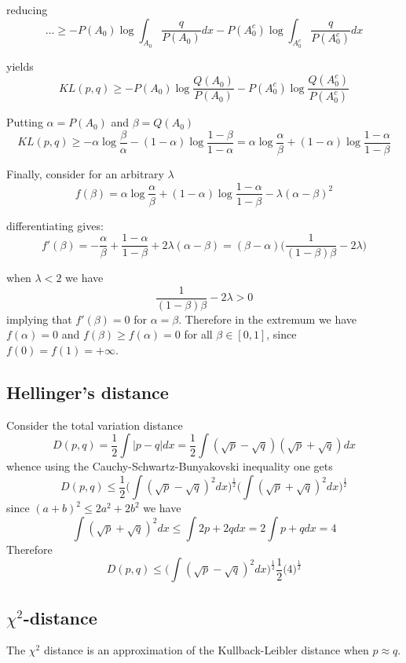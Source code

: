 \documentclass[a4paper]{article}
\begin{document}
reducing
\[\ldots \geq -P(A_0) \log \int_{A_0}\frac{q}{P(A_0)} dx -P(A_0^c) \log \int_{A_0^c} \frac{q}{P(A_0^c)} dx \]

yields
\[KL(p,q) \geq -P(A_0) \log \frac{Q(A_0)}{P(A_0)} -P(A_0^c) \log \frac{Q(A_0^c)}{P(A_0^c)} \]

Putting $\alpha = P(A_0)$ and $\beta = Q(A_0)$
\[KL(p,q) \geq -\alpha \log \frac{\beta}{\alpha} -(1-\alpha) \log \frac{1-\beta}{1-\alpha} = \alpha \log \frac{\alpha}{\beta} + (1-\alpha) \log \frac{1-\alpha}{1-\beta} \]

Finally, consider for an arbitrary $\lambda$
\[f(\beta) = \alpha \log \frac{\alpha}{\beta} + (1-\alpha) \log \frac{1-\alpha}{1-\beta} - \lambda (\alpha - \beta)^2\]

differentiating gives:
\[f'(\beta) = -\frac{\alpha}{\beta} + \frac{1-\alpha}{1-\beta} + 2\lambda (\alpha - \beta) = (\beta - \alpha)\Big(\frac{1}{(1-\beta)\beta} - 2\lambda\Big)\]

when $\lambda < 2$ we have
\[\frac{1}{(1-\beta)\beta} - 2\lambda > 0\]
implying that $f'(\beta) = 0$ for $\alpha=\beta$.
Therefore in the extremum we have $f(\alpha) = 0$ and $f(\beta)\geq f(\alpha) = 0$ for all $\beta\in [0,1]$, since $f(0)=f(1)=+\infty$.

\subsection{Hellinger's distance} %
\label{sub:hellinger_s_distance}

Consider the total variation distance
\[D(p,q) = \frac{1}{2}\int |p-q| dx = \frac{1}{2}\int (\sqrt{p}-\sqrt{q})(\sqrt{p}+\sqrt{q}) dx\]
whence using the Cauchy-Schwartz-Bunyakovski inequality one gets
\[D(p,q) \leq \frac{1}{2}\Big(\int (\sqrt{p}-\sqrt{q})^2dx\Big)^\frac{1}{2}\Big(\int (\sqrt{p}+\sqrt{q})^2dx\Big)^\frac{1}{2}\]
since $(a+b)^2\leq 2 a^2 + 2 b^2$ we have
\[\int (\sqrt{p}+\sqrt{q})^2dx \leq \int 2p+2q dx = 2 \int p+q dx = 4\]
Therefore
\[D(p,q) \leq \Big(\int (\sqrt{p}-\sqrt{q})^2dx\Big)^\frac{1}{2} \frac{1}{2}\Big(4\Big)^\frac{1}{2}\]


\subsection{$\chi^2$-distance} %
\label{sub:chi2_distance}

The $\chi^2$ distance is an approximation of the Kullback-Leibler distance when $p\approx q$.
\end{document}
